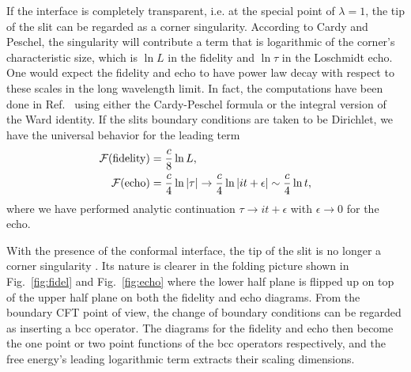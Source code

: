 If the interface is completely transparent, i.e. at the special point of $\lambda = 1$, the tip of the slit can be regarded as a corner singularity. According to Cardy and Peschel\cite{cardy_finite-size_1988}, the singularity will contribute a term that is logarithmic of the corner's characteristic size, which is $\ln L$ in the fidelity and $\ln \tau$ in the Loschmidt echo. One would expect the fidelity and echo to have power law decay with respect to these scales in the long wavelength limit. In fact, the computations have been done in Ref.~ using either the Cardy-Peschel formula or the integral version of the Ward identity. If the slits boundary conditions are taken to be Dirichlet, we have the universal behavior for the leading term \cite{stephan_logarithmic_2013,stephan_local_2011}
\begin{equation}
\label{eq:full-pass}
\begin{aligned}
  \mathcal{F}({\rm fidelity}) &=  \frac{c}{8} \ln L, \\
 \mathcal{F}( {\rm echo} )  &= \frac{c}{4} \ln |\tau| \rightarrow \frac{c}{4} \ln |it + \epsilon|   \sim \frac{c}{4}\ln t ,
\end{aligned}
\end{equation}
where we have performed analytic continuation $\tau \rightarrow it + \epsilon$ with $\epsilon \rightarrow 0$ for the echo.

With the presence of the conformal interface, the tip of the slit is no longer a corner singularity\cite{cardy_finite-size_1988} . Its nature is clearer in the folding picture shown in Fig.~\ref{fig:fidel} and Fig.~\ref{fig:echo} where the lower half plane is flipped up on top of the upper half plane on both the fidelity and echo diagrams. From the boundary CFT point of view, the change of boundary conditions can be regarded as inserting a bcc operator. The diagrams for the fidelity and echo then become the one point or two point functions of the bcc operators respectively, and the free energy's leading logarithmic term extracts their scaling dimensions. 


